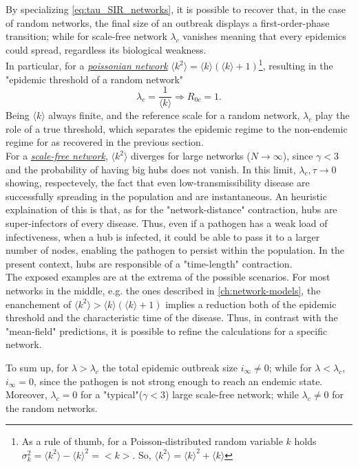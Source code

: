 \documentclass[a4paper,12pt,twoside]{book} %
\theoremstyle{definition}
\begin{document}
By specializing \autoref{eq:tau_SIR_networks}, it is possible to recover that, in the case of random networks, the final size of an outbreak displays a first-order-phase transition; while for scale-free network $\lambda_c$ vanishes meaning that every epidemics could spread, regardless its biological weakness.
\\In particular, for a \underline{\textit{poissonian network}} $\langle k^2 \rangle = \langle k \rangle (\langle k \rangle + 1 )$\footnote{As a rule of thumb, for a Poisson-distributed random variable $k$ holds $\sigma_k^2 = \langle k^2 \rangle - \langle k \rangle^2 = <k>$. So, $\langle k^2 \rangle = \langle k \rangle^2 + \langle k \rangle$}, 
resulting in the "epidemic threshold of a random network" \cite{barabasi::2016networkbook}
\[ \lambda_c = 
	\frac{1}{\langle k \rangle} \Rightarrow R_{0c} = 1.
\]
Being $\langle k \rangle$ always finite, and the reference scale for a random network, $\lambda_c$ play the role of a true threshold, which separates the epidemic regime to the non-endemic regime for as recovered in the previous section.
\\For a \underline{\textit{scale-free network}}, $\langle k^2 \rangle$ diverges for large networks ($N\to \infty$), since $\gamma < 3$ and the probability of having big hubs does not vanish. In this limit, $\lambda_c, \tau \to 0$ showing, respectevely, the fact that even low-transmissibility disease are successfully spreading in the population and are instantaneous.
An heuristic explaination of this is that, as for the "network-distance" contraction, hubs are super-infectors of every disease. Thus, even if a pathogen has a weak load of infectiveness, when a hub is infected, it could be able to pass it to a larger number of nodes, enabling the pathogen to persist within the population. In the present context, hubs are responsible of a "time-length" contraction.
\\The exposed examples are at the extrema of the possible scenarios. For most networks in the middle, e.g. the ones described in \autoref{ch:network-models}, the enanchement of $\langle k^2 \rangle > \langle k \rangle (\langle k \rangle +1)$ implies a reduction both of the epidemic threshold and the characteristic time of the disease. Thus, in contrast with the "mean-field" predictions, it is possible to refine the calculations for a specific network.

To sum up, for $\lambda>\lambda_c$ the total epidemic outbreak size $i_{\infty} \neq0$; while for $\lambda < \lambda_c$, $i_{\infty} = 0$, since the pathogen is not strong enough to reach an endemic state.
Moreover, $\lambda_c = 0$ for a "typical"($\gamma<3$) large scale-free network; while $\lambda_c \neq0$ for the random networks.
\end{document}
